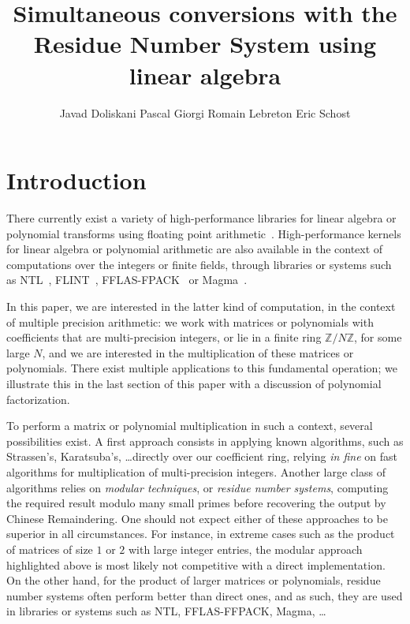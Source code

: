 \documentclass[acmtoms]{acmsmall}
\title{
Simultaneous conversions with the Residue Number System using linear algebra
}
\author{
Javad Doliskani \affil{University of Waterloo}
Pascal Giorgi \affil{LIRMM CNRS - University of Montpellier}
Romain Lebreton \affil{LIRMM CNRS - University of Montpellier}
Eric Schost \affil{University of Waterloo}
}
\def\Z{\mathbb{Z}}
\begin{document}
            
            
\maketitle



\section{Introduction}


There currently exist a variety of high-performance libraries for
linear algebra or polynomial transforms using floating point
arithmetic~\cite{Whaley2001,Goto2008,FFTW05,Pueschel:05}.
High-performance kernels for linear algebra or polynomial arithmetic
are also available in the context of computations over the integers or
finite fields, through libraries or systems such as
NTL~\cite{Shoup95}, FLINT~\cite{Hart2010},
FFLAS-FPACK~\cite{fflas-ffpack} or Magma~\cite{BoCaPl97}.  

In this paper, we are interested in the latter kind of computation, in
the context of multiple precision arithmetic: we work with matrices or
polynomials with coefficients that are multi-precision integers, or
lie in a finite ring $\Z/N\Z$, for some large $N$, and we are
interested in the multiplication of these matrices or
polynomials. There exist multiple applications to this fundamental
operation; we illustrate this in the last section of this paper with a
discussion of polynomial factorization.

To perform a matrix or polynomial multiplication in such a context,
several possibilities exist. A first approach consists in applying
known algorithms, such as Strassen's, Karatsuba's, \dots directly over
our coefficient ring, relying {\it in fine} on fast algorithms for
multiplication of multi-precision integers. Another large class of
algorithms relies on {\em modular techniques}, or {\em residue number
  systems}, computing the required result modulo many small primes
before recovering the output by Chinese Remaindering.  One should not
expect either of these approaches to be superior in all
circumstances. For instance, in extreme cases such as the product of
matrices of size $1$ or $2$ with large integer entries, the modular
approach highlighted above is most likely not competitive with a
direct implementation. On the other hand, for the product of larger
matrices or polynomials, residue number systems often perform better
than direct ones, and as such, they are used in libraries or systems
such as NTL, FFLAS-FFPACK, Magma, \dots
\end{document}

